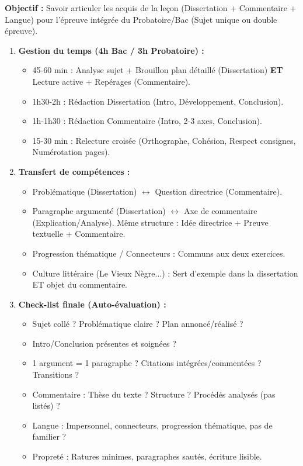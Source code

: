 \documentclass[11pt]{article}
\newcommand{\cle}[1]{{\popxbold\color{popdark}#1}}
\begin{document}
\begin{methode}
    \textbf{Objectif :} Savoir articuler les acquis de la leçon (Dissertation + Commentaire + Langue) pour l'épreuve intégrée du Probatoire/Bac (Sujet unique ou double épreuve).
    \begin{enumerate}
        \item \textbf{Gestion du temps (4h Bac / 3h Probatoire) :}
            \begin{itemize}
                \item 45-60 min : Analyse sujet + Brouillon plan détaillé (Dissertation) \textbf{ET} Lecture active + Repérages (Commentaire).
                \item 1h30-2h : Rédaction Dissertation (Intro, Développement, Conclusion).
                \item 1h-1h30 : Rédaction Commentaire (Intro, 2-3 axes, Conclusion).
                \item 15-30 min : \cle{Relecture croisée} (Orthographe, Cohésion, Respect consignes, Numérotation pages).
            \end{itemize}
        \item \textbf{Transfert de compétences :}
            \begin{itemize}
                \item \cle{Problématique (Dissertation)} $\leftrightarrow$ \cle{Question directrice (Commentaire)}.
                \item \cle{Paragraphe argumenté (Dissertation)} $\leftrightarrow$ \cle{Axe de commentaire (Explication/Analyse)}. Même structure : Idée directrice + Preuve textuelle + Commentaire.
                \item \cle{Progression thématique / Connecteurs} : Communs aux deux exercices.
                \item \cle{Culture littéraire (Le Vieux Nègre...)} : Sert d'exemple dans la dissertation ET objet du commentaire.
            \end{itemize}
        \item \textbf{Check-list finale (Auto-évaluation) :}
            \begin{itemize}
                \item [ ] Sujet collé ? Problématique claire ? Plan annoncé/réalisé ?
                \item [ ] Intro/Conclusion présentes et soignées ?
                \item [ ] 1 argument = 1 paragraphe ? Citations intégrées/commentées ? Transitions ?
                \item [ ] Commentaire : Thèse du texte ? Structure ? Procédés analysés (pas listés) ?
                \item [ ] Langue : Impersonnel, connecteurs, progression thématique, pas de familier ?
                \item [ ] Propreté : Ratures minimes, paragraphes sautés, écriture lisible.
            \end{itemize}
    \end{enumerate}
\end{methode}
\end{document}
